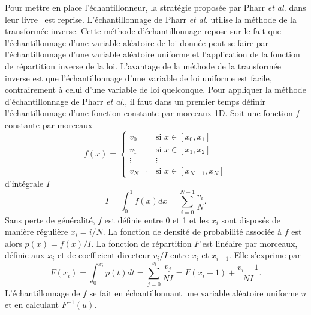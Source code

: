 Pour mettre en place l'échantillonneur, la stratégie proposée par Pharr \textit{et al.} dans leur livre~\cite{pharr_physically_2023} est reprise. L'échantillonnage de Pharr \textit{et al.} utilise la méthode de la transformée inverse. Cette méthode d'échantillonnage repose sur le fait que l'échantillonnage d'une variable aléatoire de loi donnée peut se faire par l'échantillonnage d'une variable aléatoire uniforme et l'application de la fonction de répartition inverse de la loi. L'avantage de la méthode de la transformée inverse est que l'échantillonnage d'une variable de loi uniforme est facile, contrairement à celui d'une variable de loi quelconque. Pour appliquer la méthode d'échantillonnage de Pharr \textit{et al.}, il faut dans un premier temps définir l'échantillonnage d'une fonction constante par morceaux 1D. Soit une fonction $f$ constante par morceaux
\begin{equation}
    f(x) = \left\{
        \begin{array}{ll}
            v_0 & \mbox{si } x \in [x_0, x_1] \\
            v_1 & \mbox{si } x \in [x_1, x_2] \\
            \vdots & \vdots \\
            v_{N-1} & \mbox{si } x \in [x_{N-1}, x_N]
        \end{array}
    \right.
\end{equation}
d'intégrale $I$
\begin{equation}
    I = \int_{0}^{1} f(x) dx = \sum_{i=0}^{N-1} \frac{v_i}N.
\end{equation}
Sans perte de généralité, $f$ est définie entre 0 et 1 et les $x_i$ sont disposés de manière régulière $x_i = i / N$. La fonction de densité de probabilité associée à $f$ est alors $p(x) = f(x) / I$. La fonction de répartition $F$ est linéaire par morceaux, définie aux $x_i$ et de coefficient directeur $v_i/I$ entre $x_i$ et $x_{i+1}$. Elle s'exprime par
\begin{equation}
    F(x_i) = \int_{0}^{x_i} p(t) dt = \sum_{j=0}^{x_i} \frac{v_j}{NI} = F(x_i-1) + \frac{v_i-1}{NI}.
\end{equation}
L'échantillonnage de $f$ se fait en échantillonnant une variable aléatoire uniforme $u$ et en calculant $F^{-1}(u)$.

\bigskip

